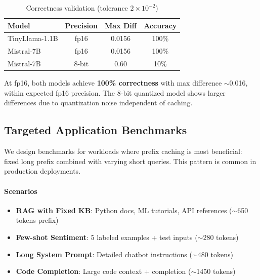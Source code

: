 \documentclass{article}
\begin{document}
\begin{table}[t]
\centering
\caption{Correctness validation (tolerance $2\times10^{-2}$)}
\label{tab:correctness}
\small
\begin{tabular}{lccc}
\toprule
Model & Precision & Max Diff & Accuracy \\
\midrule
TinyLlama-1.1B & fp16 & 0.0156 & 100\% \\
Mistral-7B & fp16 & 0.0156 & 100\% \\
Mistral-7B & 8-bit & 0.60 & 10\% \\
\bottomrule
\end{tabular}
\end{table}

At fp16, both models achieve \textbf{100\% correctness} with max difference $\sim$0.016, within expected fp16 precision.
The 8-bit quantized model shows larger differences due to quantization noise independent of caching.

\subsection{Targeted Application Benchmarks}

We design benchmarks for workloads where prefix caching is most beneficial: fixed long prefix combined with varying short queries.
This pattern is common in production deployments.

\paragraph{Scenarios}
\begin{itemize}
    \item \textbf{RAG with Fixed KB}: Python docs, ML tutorials, API references ($\sim$650 tokens prefix)
    \item \textbf{Few-shot Sentiment}: 5 labeled examples + test inputs ($\sim$280 tokens)
    \item \textbf{Long System Prompt}: Detailed chatbot instructions ($\sim$480 tokens)
    \item \textbf{Code Completion}: Large code context + completion ($\sim$1450 tokens)
\end{itemize}
\end{document}
